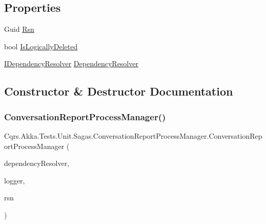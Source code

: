 \subsection*{Properties}
\begin{DoxyCompactItemize}
\item 
Guid \hyperlink{classCqrs_1_1Akka_1_1Tests_1_1Unit_1_1Sagas_1_1ConversationReportProcessManager_a86603fe9e9fa5e9b009064ea5ea6873a}{Rsn}
\item 
bool \hyperlink{classCqrs_1_1Akka_1_1Tests_1_1Unit_1_1Sagas_1_1ConversationReportProcessManager_a567d02405fc3a52b33d2fe2c3a98b8a3}{Is\+Logically\+Deleted}
\item 
\hyperlink{interfaceCqrs_1_1Configuration_1_1IDependencyResolver}{I\+Dependency\+Resolver} \hyperlink{classCqrs_1_1Akka_1_1Tests_1_1Unit_1_1Sagas_1_1ConversationReportProcessManager_a6ddc3cab5bedf62389eaa4c769441aa8}{Dependency\+Resolver}
\end{DoxyCompactItemize}


\subsection{Constructor \& Destructor Documentation}
\mbox{\label{classCqrs_1_1Akka_1_1Tests_1_1Unit_1_1Sagas_1_1ConversationReportProcessManager_a646ce30aa269388c16820418c5b3f63c}} 
\subsubsection{\texorpdfstring{Conversation\+Report\+Process\+Manager()}{ConversationReportProcessManager()}}
{\footnotesize\ttfamily Cqrs.\+Akka.\+Tests.\+Unit.\+Sagas.\+Conversation\+Report\+Process\+Manager.\+Conversation\+Report\+Process\+Manager (\begin{DoxyParamCaption}\item[{\hyperlink{interfaceCqrs_1_1Configuration_1_1IDependencyResolver}{I\+Dependency\+Resolver}}]{dependency\+Resolver,  }\item[{I\+Logger}]{logger,  }\item[{Guid}]{rsn }\end{DoxyParamCaption})}



